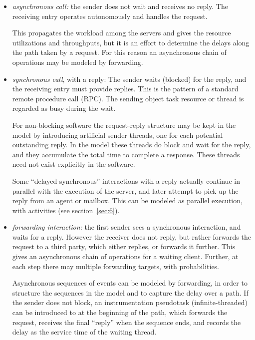 \documentclass[11pt]{article}
\begin{document}
\begin{itemize}
\item \emph{asynchronous call:} the sender does not wait and receives no
  reply. The receiving entry operates autonomously and handles the
  request. 

  This propagates the workload among the servers and gives the resource utilizations and
  throughputs, but it is an effort to determine the delays along the path taken by a request. For this
  reason an asynchronous chain of operations may be modeled by forwarding.

\item \emph{synchronous call}, with a reply: The sender waits
  (blocked) for the reply, and the receiving entry must provide
  replies. This is the pattern of a standard remote procedure call
  (RPC). The sending object task resource or thread is regarded as
  busy during the wait.
  
  For non-blocking software the request-reply structure may be kept in the model by introducing
  artificial sender threads, one for each potential outstanding reply. In the model these threads do
  block and wait for the reply, and they accumulate the total time to complete a response. These
  threads need not exist explicitly in the software.

  Some ``delayed-synchronous'' interactions with a reply actually continue in parallel with the
  execution of the server, and later attempt to pick up the reply from an agent or mailbox. This can
  be modeled as parallel execution, with activities (see section~\ref{sec:6}).

\item \emph{forwarding interaction:} the first sender sees a synchronous
  interaction, and waits for a reply. However the receiver does not
  reply, but rather forwards the request to a third party, which
  either replies, or forwards it further. This gives an asynchronous
  chain of operations for a waiting client.  Further, at each step there may multiple forwarding targets, with probabilities.

  Asynchronous sequences of events can be modeled by forwarding, in order to structure the
  sequences in the model and to capture the delay over a path. If the sender does not block, an
  instrumentation pseudotask (infinite-threaded) can be introduced to at the beginning of the path,
  which forwards the request, receives the final ``reply'' when the sequence ends, and records the
  delay as the service time of the waiting thread.
\end{itemize}
\end{document}
